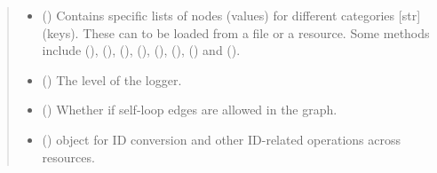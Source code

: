 \documentclass[letterpaper,10pt,english]{sphinxmanual}
\begin{document}
\begin{fulllineitems}
\begin{quote}
\begin{description}
\begin{itemize}
\item {} 
 () \textendash{} Contains specific lists of nodes (values) for different
categories {[}str{]} (keys). These can to be loaded from a file or
a resource. Some methods include
 (),
{\hyperref[\detokenize{main:pypath.main.PyPath.druggability_list}]{}} (),
{\hyperref[\detokenize{main:pypath.main.PyPath.kinases_list}]{}} (),
{\hyperref[\detokenize{main:pypath.main.PyPath.tfs_list}]{}} (),
{\hyperref[\detokenize{main:pypath.main.PyPath.disease_genes_list}]{}} (),
{\hyperref[\detokenize{main:pypath.main.PyPath.signaling_proteins_list}]{}}
(), {\hyperref[\detokenize{main:pypath.main.PyPath.proteome_list}]{}}
() and
{\hyperref[\detokenize{main:pypath.main.PyPath.cancer_drivers_list}]{}} ().

\item {} 
 () \textendash{} The level of the logger.

\item {} 
 () \textendash{} Whether if self-loop edges are allowed in the graph.

\item {} 
 () \textendash{}  object for ID conversion and
other ID-related operations across resources.


\end{itemize}
\end{description}
\end{quote}
\end{fulllineitems}
\end{document}
